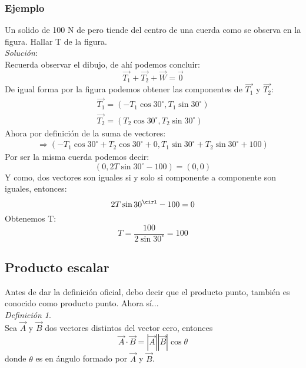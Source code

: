 \documentclass[12pt,openany]{book}
\begin{document}
			\subsubsection{Ejemplo}
			Un solido de 100 N de pero tiende del centro de una cuerda como se observa en la figura. 
			Hallar T de la figura.\\
			\noindent\textsl{Soluci\'on}:\\
			Recuerda observar el dibujo, de ah\'i podemos concluir:
			$$\vec{T_{1}}+\vec{T_{2}}+\vec{W}=\vec{0}$$
			\noindent De igual forma por la figura podemos obtener las componentes de $\vec{T_{1}}$ y 
			$\vec{T_{2}}$:
			\begin{equation*}
				\begin{split}
					\vec{T_{1}}=(-T_{1}\cos30^{\circ}, T_{1}\sin30^{\circ})\\
					\vec{T_{2}}=(T_{2}\cos30^{\circ}, T_{2}\sin30^{\circ})
				\end{split}
			\end{equation*}
			Ahora por definici\'on de la suma de vectores:
			\begin{equation*}
				\begin{split}
					\Rightarrow(-T_{1}\cos30^{\circ}+T_{2}\cos30^{\circ}+0 ,  
					T_{1}\sin30^{\circ}+T_{2}\sin30^{\circ}+100)
				\end{split}
			\end{equation*}
			\noindent Por ser la misma cuerda podemos decir:
				$$(0,2T\sin30^{\circ}-100)=(0,0)$$	
			\noindent Y como, dos vectores son iguales si y solo si componente a componente son iguales, entonces:
				$$2T\sin30^{\cirl}-100=0$$
			\noindent Obtenemos T:
				$$
					T=\frac{100}{2\sin30^{\circ}}=100
				$$

	    \subsection{Producto escalar}
	    Antes de dar la definici\'on oficial, debo decir que el producto punto, tambi\'en es conocido
	    como producto punto. Ahora s\'i...\\
	    \noindent\textsl{Definici\'on 1}.\\
	    \noindent Sea $\vec{A}$ y $\vec{B}$ dos vectores distintos del
	    vector cero, entonces 
	    $$ \vec{A}\cdot\vec{B}=|\vec{A}| |\vec{B}|\cos\theta $$
	    donde $\theta$ es en \'angulo formado por $\vec{A}$ y $\vec{B}$.	   	
\end{document}
